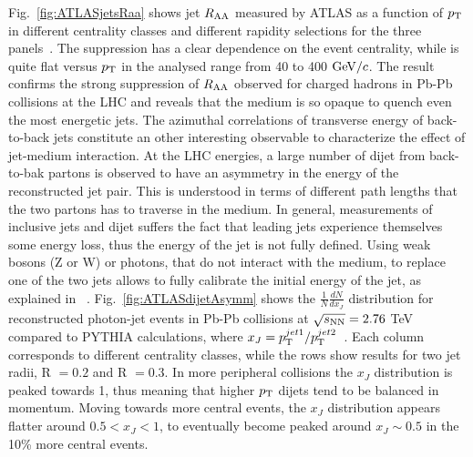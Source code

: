 Fig.~\ref{fig:ATLASjetsRaa} shows jet $R_{\rm AA}$ measured by ATLAS as a function of $p_{\rm T}$ in different centrality classes and different rapidity selections for the three panels~\cite{Aad:2014bxa}. The suppression has a clear dependence on the event centrality, while is quite flat versus $p_{\rm T}$ in the analysed range from 40 to 400 $\mathrm{GeV}/c$. The result confirms the strong suppression of $R_{\rm AA}$ observed for charged hadrons in Pb-Pb collisions at the LHC and reveals that the medium is so opaque to quench even the most energetic jets. The azimuthal correlations of transverse energy of back-to-back jets constitute an other interesting observable to characterize the effect of jet-medium interaction. At the LHC energies, a large number of dijet from back-to-bak partons is observed to have an asymmetry in the energy of the reconstructed jet pair. This is understood in terms of different path lengths that the two partons has to traverse in the medium. In general, measurements of inclusive jets and dijet suffers the fact that leading jets experience themselves some energy loss, thus the energy of the jet is not fully defined. Using weak bosons (Z or W) or photons, that do not interact with the medium, to replace one of the two jets allows to fully calibrate the initial energy of the jet, as explained in ~\cite{Wang:1996yh}. Fig.~\ref{fig:ATLASdijetAsymm} shows the $\frac{1}{N}\frac{dN}{dx_J}$ distribution for reconstructed photon-jet events in Pb-Pb collisions at $\sqrt{s_{\rm NN}} = 2.76$ TeV compared to PYTHIA calculations, where $x_J = p_{\rm T}^{jet1}/p_{\rm T}^{jet2}$~\cite{ATLAS-CONF-2012-121}. Each column corresponds to different centrality classes, while the rows show results for two jet radii, R $= 0.2$ and R $=0.3$. In more peripheral collisions the $x_J$ distribution is peaked towards 1, thus meaning that higher $p_{\rm T}$ dijets tend to be balanced in momentum. Moving towards more central events, the $x_J$ distribution appears flatter around $0.5 < x_J<1$, to eventually become peaked around $x_J \sim 0.5$ in the 10\% more central events.

